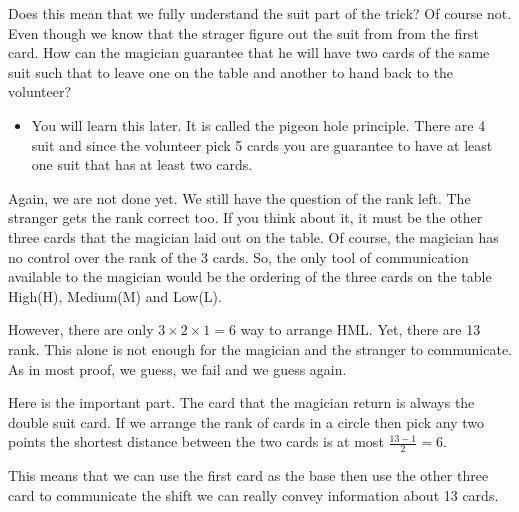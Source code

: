 \documentclass[a4paper, 12pt]{article}
\theoremstyle{examplestyle}
\begin{document}
\begin{multicols}{2}
Does this mean that we fully understand the suit part of the trick? Of course not. Even though we know that the strager figure out the suit from from the first card. How can the magician guarantee that he will have two cards of the same suit such that to leave one on the table and another to hand back to the volunteer?

\begin{itemize}
	\item You will learn this later. It is called the pigeon hole principle. There are 4 suit and since the volunteer pick 5 cards you are guarantee to have at least one suit that has at least two cards.
\end{itemize}

Again, we are not done yet. We still have the question of the rank left. The stranger gets the rank correct too. If you think about it, it must be the other three cards that the magician laid out on the table. Of course, the magician has no control over the rank of the 3 cards. So, the only tool of communication available to the magician would be the ordering of the three cards on the table High(H), Medium(M) and Low(L).

However, there are only $3\times 2 \times 1 = 6$ way to arrange HML. Yet, there are 13 rank. This alone is not enough for the magician and the stranger to communicate. As in most proof, we guess, we fail and we guess again.

Here is the important part. The card that the magician return is always the double suit card. If we arrange the rank of cards in a circle then pick any two points the shortest distance between the two cards is at most $\frac{13-1}{2} = 6$. 

\begin{center}
\end{center}

This means that we can use the first card as the base then use the other three card to communicate the shift we can really convey information about 13 cards.


\end{multicols}
\end{document}
